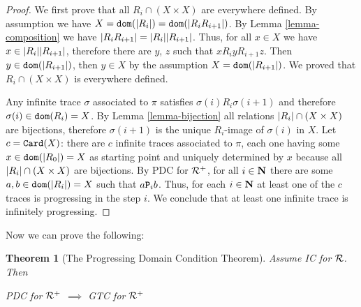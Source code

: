 \documentclass{lmcs}
\newtheorem{theorem}{Theorem}[section]
\begin{document}
\begin{proof}
We first prove that all $R_i \cap (X \times X)$ are everywhere defined.
By assumption we have $X = {\tt dom}({| R_i |}) =  {\tt dom}({| R_iR_{i+1} |})$. By 
Lemma \ref{lemma-composition} we have ${| R_iR_{i+1} |} = {| R_i |} 
{| R_{i+1} |}$. Thus, for all $x \in X$ we have 
$x \in  {| R_i |} {| R_{i+1} |}$, 
therefore there are $y$, $z$ such that $x R_i y R_{i+1} z$. Then $y \in 
{\tt dom}({| R_{i+1} |})$, then $y \in X$ by the assumption $X = {\tt dom}({| R_{i+1} |})
$. We proved that $R_i \cap (X \times X)$ is everywhere defined. 

Any infinite trace $\sigma$ associated to $\pi$ satisfies $\sigma(i) R_i \sigma(i+1)$
and therefore $\sigma(i) \in {\tt dom}(R_i) = X$. By Lemma \ref{lemma-bijection} all relations 
${| R_i |} \cap (X \times X)$ are bijections, therefore $\sigma(i+1)$ is the
unique $R_i$-image of $\sigma(i)$ in $X$. Let $c = {\tt Card}(X)$: 
there are $c$ infinite traces associated to $\pi$, each one having some 
$x \in {\tt dom}({| R_0 |}) = X$ as starting point and uniquely determined by $x$ 
because all ${| R_i |} \cap (X \times X)$ are bijections. By 
PDC for ${\mathcal R}^+$, for all $i \in {\bf N}$ there are some $a,b \in {\tt dom}({| R_i |})=X$ such 
that $a {\tt P}_i b$. Thus, for each $i \in {\bf N}$ at least one of the $c$ traces is progressing
in the step $i$. 
We conclude that at least one infinite trace is infinitely progressing.
\end{proof}

Now we can prove the following:

\begin{theorem}[The Progressing Domain Condition Theorem]
\label{theorem-PDC}
Assume IC for ${\mathcal R}$. Then
\begin{center}
PDC for ${\mathcal R}^+$ $\implies$ GTC for ${\mathcal R}^+$
\end{center}
\end{theorem}
\end{document}
